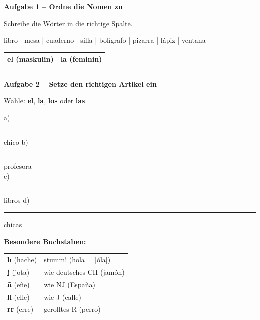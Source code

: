 \documentclass[11pt, a4paper]{article}
\newcommand{\fachfarbe}{spanisch}
\newcommand{\punktebox}[1]{\hfill\fbox{\small \_/#1}}
\newcommand{\luecke}[1]{\rule{#1}{0.4pt}}
\newenvironment{aufgabe}[1]{%
    \needspace{5\baselineskip}%
    \nopagebreak[4]%
    \vspace{10pt}
    \noindent\textbf{\textcolor{\fachfarbe}{Aufgabe #1}}
    \nopagebreak[4]%
    \vspace{5pt}
    \nopagebreak[4]%
    \begin{list}{}{\leftmargin=0pt}
    \item[]
}{%
    \end{list}
}
\newcommand{\es}[1]{\textcolor{\fachfarbe}{\textbf{#1}}}
\begin{document}
\vspace{10pt}


\begin{aufgabe}{1 -- Ordne die Nomen zu}
Schreibe die Wörter in die richtige Spalte. \punktebox{4}
\end{aufgabe}

\begin{vokabelkasten}
libro | mesa | cuaderno | silla | bolígrafo | pizarra | lápiz | ventana
\end{vokabelkasten}

\vspace{0.5em}

\begin{center}
\begin{tabular}{|p{6cm}|p{6cm}|}
\hline
\textbf{\es{el} (maskulin)} & \textbf{\es{la} (feminin)} \\
\hline
& \\[2.5em]
& \\[2.5em]
\hline
\end{tabular}
\end{center}

\vspace{10pt}


\begin{aufgabe}{2 -- Setze den richtigen Artikel ein}
Wähle: \es{el}, \es{la}, \es{los} oder \es{las}. \punktebox{4}
\end{aufgabe}

\noindent
a) \luecke{1.5cm} chico \hfill
b) \luecke{1.5cm} profesora \\[0.8em]
c) \luecke{1.5cm} libros \hfill
d) \luecke{1.5cm} chicas \\

\vspace{15pt}


\begin{merkkasten}
\textbf{Besondere Buchstaben:}

\vspace{0.3em}

\begin{tabular}{ll}
\es{h} (hache) & stumm! (hola = [óla]) \\
\es{j} (jota) & wie deutsches CH (jamón) \\
\es{ñ} (eñe) & wie NJ (España) \\
\es{ll} (elle) & wie J (calle) \\
\es{rr} (erre) & gerolltes R (perro) \\
\end{tabular}
\end{merkkasten}
\end{document}
